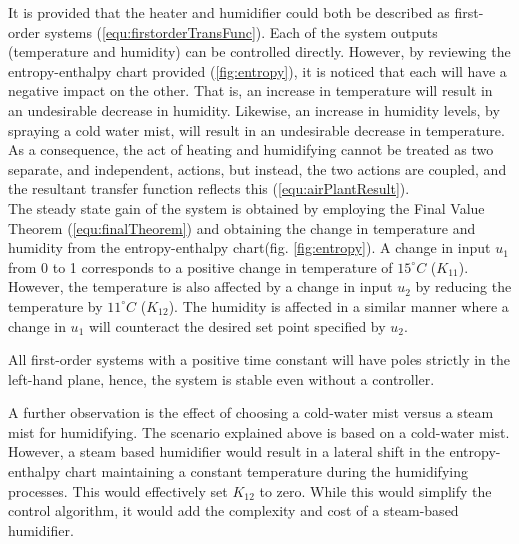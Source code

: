 \documentclass[a4paper, titlepage]{article}
\begin{document}
It is provided that the heater and humidifier could both be described as first-order systems (\ref{equ:firstorderTransFunc}).
Each of the system outputs (temperature and humidity) can be controlled directly.  
However, by reviewing the entropy-enthalpy chart provided (\ref{fig:entropy}), it is noticed that each will have a negative impact on the other.  
That is, an increase in temperature will result in an undesirable decrease in humidity.  
Likewise, an increase in humidity levels, by spraying a cold water mist, will result in an undesirable decrease in temperature.\\

As a consequence, the act of heating and humidifying cannot be treated as two separate, and independent, actions, but instead, the two actions are coupled, and the resultant transfer function reflects this (\ref{equ:airPlantResult}).\\

The steady state gain of the system is obtained by employing the Final Value Theorem (\ref{equ:finalTheorem}) and obtaining the change in temperature and humidity from the entropy-enthalpy chart(fig. \ref{fig:entropy}).  A change in input $u_1$ from 0 to 1 corresponds to a positive change in temperature of $15^\circ C$ ($K_{11}$).  However, the temperature is also affected by a change in input $u_2$ by reducing the temperature by $11^\circ C$ ($K_{12}$).  The humidity is affected in a similar manner where a change in $u_1$ will counteract the desired set point specified by $u_2$.       


All first-order systems with a positive time constant will have poles strictly in the left-hand plane, hence, the system is stable even without a controller.
 
A further observation is the effect of choosing a cold-water mist versus a steam mist for humidifying.  The scenario explained above is based on a cold-water mist.  However, a steam based humidifier would result in a lateral shift in the entropy-enthalpy chart maintaining a constant temperature during the humidifying processes.  This would effectively set $K_{12}$ to zero.  While this would simplify the control algorithm, it would add the complexity and cost of a steam-based humidifier.\\   
\end{document}
